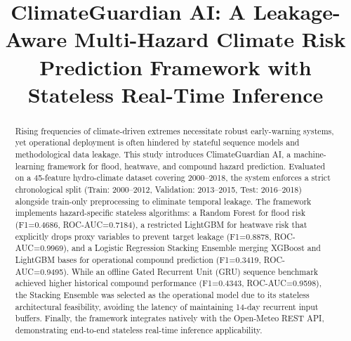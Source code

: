 \documentclass[conference]{IEEEtran}
\begin{document}
\title{ClimateGuardian AI: A Leakage-Aware Multi-Hazard Climate Risk Prediction Framework with Stateless Real-Time Inference}

\author{
\and
{}
\and
{}
\and
{}
}

\maketitle

\begin{abstract}
Rising frequencies of climate-driven extremes necessitate robust early-warning systems, yet operational deployment is often hindered by stateful sequence models and methodological data leakage. This study introduces ClimateGuardian AI, a machine-learning framework for flood, heatwave, and compound hazard prediction. Evaluated on a 45-feature hydro-climate dataset covering 2000--2018, the system enforces a strict chronological split (Train: 2000--2012, Validation: 2013--2015, Test: 2016--2018) alongside train-only preprocessing to eliminate temporal leakage. The framework implements hazard-specific stateless algorithms: a Random Forest for flood risk (F1=0.4686, ROC-AUC=0.7184), a restricted LightGBM for heatwave risk that explicitly drops proxy variables to prevent target leakage (F1=0.8878, ROC-AUC=0.9969), and a Logistic Regression Stacking Ensemble merging XGBoost and LightGBM bases for operational compound prediction (F1=0.3419, ROC-AUC=0.9495). While an offline Gated Recurrent Unit (GRU) sequence benchmark achieved higher historical compound performance (F1=0.4343, ROC-AUC=0.9598), the Stacking Ensemble was selected as the operational model due to its stateless architectural feasibility, avoiding the latency of maintaining 14-day recurrent input buffers. Finally, the framework integrates natively with the Open-Meteo REST API, demonstrating end-to-end stateless real-time inference applicability.
\end{abstract}
\end{document}

